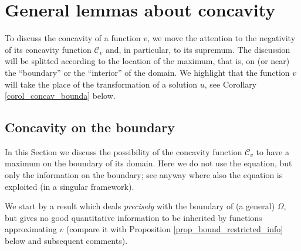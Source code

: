 \documentclass[11pt, reqno]{amsart}
\theoremstyle{definition}
\numberwithin{equation}{section}
\newcommand{\mc}[1]{\mathcal{#1}}
\begin{document}
\section{General lemmas about concavity} 
\label{sec_diff_bound}

To discuss the concavity of a function $v$, we move the attention to the negativity of its concavity function $\mc{C}_v$ and, in particular, to its supremum. The discussion will be splitted according to the location of the maximum, that is, on (or near) the ``boundary'' or the ``interior'' of the domain.
We highlight that the function $v$ will take the place of the transformation of a solution $u$, see Corollary \ref{corol_concav_bounda} below.

\subsection{Concavity on the boundary}

In this Section we discuss the possibility of the concavity function $\mc{C}_v$ to have a maximum on the boundary of its domain. 
Here we do not use the equation, but only the information on the boundary; see anyway \cite[Lemma 3.3]{BGP99} where also the equation is exploited (in a singular framework). 

\smallskip

We start by a result which deals \emph{precisely} with the boundary of (a general) $\Omega$, but gives no good quantitative information to be inherited by functions approximating $v$ (compare it with Proposition \ref{prop_bound_restricted_info} below and subsequent comments). 
\end{document}
